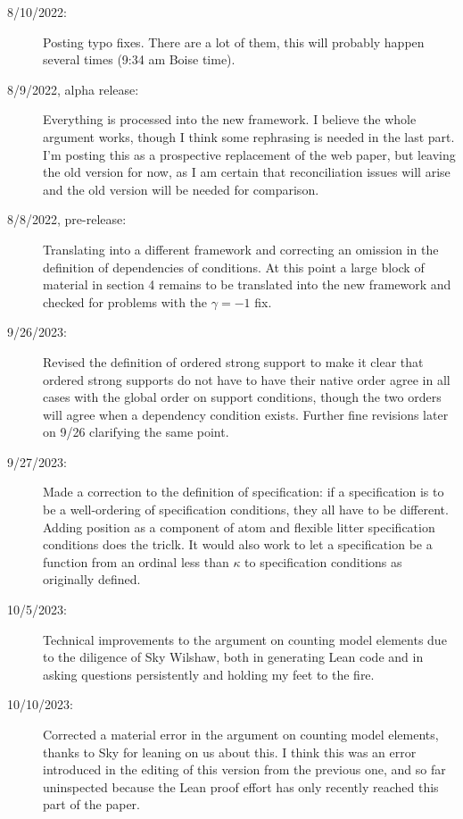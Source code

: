 \documentclass[112pt]{article}
\begin{document}
\begin{description}
\item[8/10/2022:]  Posting typo fixes.  There are a lot of them, this will probably happen several times (9:34 am Boise time).

\item[8/9/2022, alpha release:]  Everything is processed into the new framework.  I believe the whole argument works, though I think some rephrasing is needed in the last part.  I'm posting this as a prospective replacement of the web paper, but leaving the old version for now, as I am certain that reconciliation issues will arise
and the old version will be needed for comparison.

\item[8/8/2022, pre-release:]  Translating into a different framework and correcting an omission in the definition of dependencies of conditions.  At this point a large block of material in section 4 remains to be translated into the new framework and checked for problems with the $\gamma = -1$ fix.

\item[9/26/2023:]  Revised the definition of ordered strong support to make it clear that ordered strong supports do not have to have their native order agree in all cases with the global order on support conditions, though the two orders will agree when a dependency condition exists.  Further fine revisions later on 9/26 clarifying the same point.

\item[9/27/2023:]  Made a correction to the definition of specification:  if a specification is to be a well-ordering of specification conditions, they all have to be different.  Adding position as a component of atom and  flexible litter specification conditions does the triclk.  It would also work to let a specification be a function from an ordinal less than $\kappa$ to specification conditions as originally defined.
\item[10/5/2023:]  Technical improvements to the argument on counting model elements due to the diligence of Sky Wilshaw, both in generating Lean code and in asking questions persistently and holding my feet to the fire.

\item[10/10/2023:]  Corrected a material error in the argument on counting model elements, thanks to Sky for leaning on us about this.  I think this was an error introduced in the editing of this version from the previous one, and so far uninspected because the Lean proof effort has only recently reached this part of the paper.


\end{description}
\end{document}
